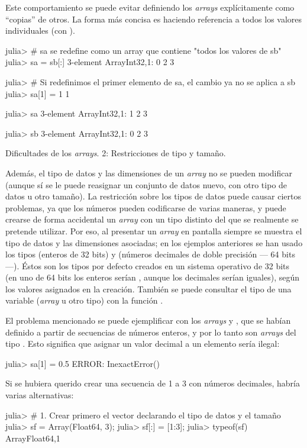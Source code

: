 ﻿\documentclass[spanish]{article}
\begin{document}
Este comportamiento se puede evitar definiendo los \emph{arrays} explícitamente
como ``copias'' de otros. La forma más concisa es haciendo referencia
a todos los valores individuales (con \code{{[}:{]}}).

julia> \# sa se redefine como un array que contiene "todos los valores de sb"
julia> sa = sb{[}:{]}
3-element Array{Int32,1}:
 0 2 3

julia> \# Si redefinimos el primer elemento de sa, el cambio ya no se aplica a sb
julia> sa{[}1{]} = 1 1

julia> sa
3-element
Array{Int32,1}:
 1 2 3

julia> sb
3-element Array{Int32,1}:
 0 2 3

Dificultades de los \emph{arrays}. 2: Restricciones de tipo y tamaño.

Además, el tipo de datos y las dimensiones de un \emph{array} no se
pueden modificar (aunque sí se le puede reasignar un conjunto de datos
nuevo, con otro tipo de datos u otro tamaño). La restricción sobre
los tipos de datos puede causar ciertos problemas, ya que los números
pueden codificarse de varias maneras, y puede crearse de forma accidental
un \emph{array} con un tipo distinto del que se realmente se pretende
utilizar. Por eso, al presentar un \emph{array} en pantalla siempre
se muestra el tipo de datos y las dimensiones asociadas; en los ejemplos
anteriores se han usado los tipos  (enteros de 32 bits)
y  (números decimales de doble precisión --- 64 bits
---). Éstos son los tipos por defecto creados en un sistema operativo
de 32 bits (en uno de 64 bits los enteros serían , aunque
los decimales serían iguales), según los valores asignados en la creación.
También se puede consultar el tipo de una variable (\emph{array} u
otro tipo) con la función .

El problema mencionado se puede ejemplificar con los \emph{arrays}
 y , que se habían definido a partir de secuencias
de números enteros, y por lo tanto son \emph{arrays} del tipo .
Esto significa que asignar un valor decimal a un elemento sería ilegal:

julia> sa{[}1{]} = 0.5
ERROR: InexactError()

Si se hubiera querido crear una secuencia de 1 a 3 con números decimales,
habría varias alternativas:

julia> \# 1. Crear primero el vector declarando el tipo de datos y el tamaño
julia> sf = Array(Float64, 3);
julia> sf{[}:{]} = {[}1:3{]};
julia> typeof(sf)
Array{Float64,1}
\end{document}
